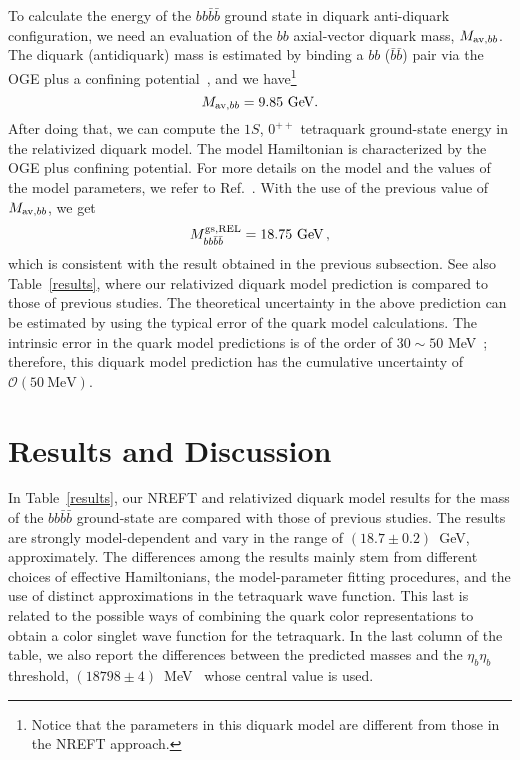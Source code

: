 \documentclass[twocolumn,showpacs,superscriptaddress,preprintnumbers,nofootinbib,prd]{revtex4-1}
\begin{document}
To calculate the energy of the $b b\bar b \bar b$ ground state in diquark anti-diquark configuration, we need an
evaluation of the $b b$ axial-vector diquark mass, $M_{{\rm av}, bb}$.
The diquark (antidiquark) mass is estimated by binding a $bb$ ($\bar b \bar b$)
pair via the OGE plus a confining potential~\cite{Godfrey:1985xj}, and we have\footnote{Notice that the
parameters in this diquark model are different from those in the NREFT
approach.}
\begin{equation}
	M_{{\rm av}, bb} = 9.85~{\rm GeV}.
\end{equation}	
After doing that, we can compute the $1S$, $0^{++}$ tetraquark ground-state
energy in the relativized diquark model. The model Hamiltonian is characterized
by the OGE plus confining potential. For more details on the model and the
values of the model parameters, we refer to Ref.~\cite{Anwar:2018sol}.
With the use of the previous value of $M_{{\rm av}, bb}$, we get
\begin{equation}
	M_{b b \bar b \bar b}^{\rm gs, REL} = 18.75 \mbox{ GeV}\,,
\end{equation}
which is consistent with the result obtained in the previous subsection.
See also Table~\ref{results}, where our relativized diquark model prediction is
compared to those of previous studies.
The theoretical uncertainty in the above prediction can be estimated
by using the typical error of the quark model calculations.
The intrinsic error in the quark model predictions is of the order of $30\sim50$ MeV~\cite{charmonium};
therefore, this diquark model prediction has the cumulative uncertainty of $\mathcal O (50~\textrm{MeV})$.


\section{Results and Discussion}
\label{resultDiss}

In Table~\ref{results}, our NREFT and relativized diquark model results for the
mass of the $b b \bar b \bar b$ ground-state are compared with those of previous
studies.
The results are strongly model-dependent and vary in the range of
$(18.7\pm0.2)$~GeV, approximately.
The differences among the results mainly stem from different choices of effective
Hamiltonians, the model-parameter fitting procedures, and the use of
distinct approximations in the tetraquark wave function.
This last is related to the possible ways of combining the quark color
representations to obtain a color singlet wave function for the tetraquark.
In the last column of the table, we also report the differences between the
predicted masses and the $\eta_b\eta_b$ threshold, $(18798 \pm
4)$~MeV~\cite{Nakamura:2010zzi} whose central value is used.
\end{document}
